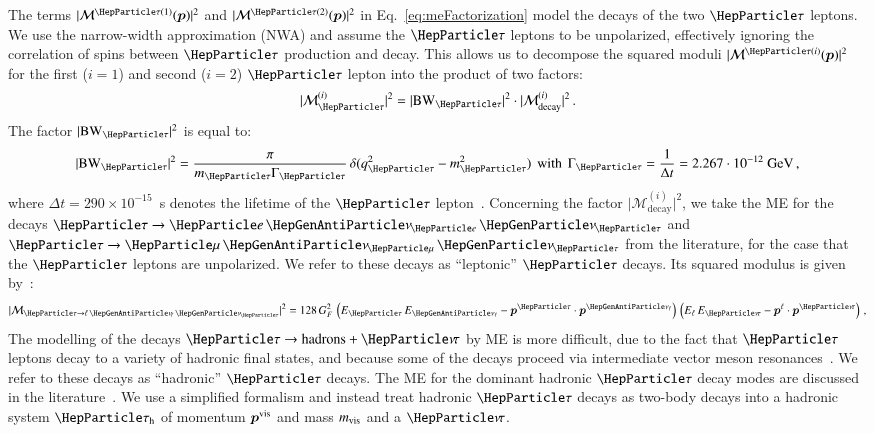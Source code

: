 The terms $\vert \mathcal{M}^{\Pgt(1)}(\bm{p}) \vert^{2}$ and $\vert
\mathcal{M}^{\Pgt(2)}(\bm{p}) \vert^{2}$ in Eq.~\ref{eq:meFactorization} model the decays of the two $\Pgt$ leptons.
We use the narrow-width approximation (NWA) and assume the $\Pgt$ leptons to be unpolarized,
effectively ignoring the correlation of spins between $\Pgt$ production and decay.
This allows us to decompose the squared moduli $\vert
\mathcal{M}^{\Pgt(i)}(\bm{p}) \vert^{2}$ for the first ($i=1$) and
second ($i=2$) $\Pgt$ lepton into the product of two factors:
\begin{equation}
\vert \mathcal{M}^{(i)}_{\Pgt} \vert^{2} = \vert \BW_{\Pgt} \vert^{2} \cdot \vert \mathcal{M}^{(i)}_{\textrm{decay}} \vert^{2} \, .
\end{equation}
The factor $\vert \BW_{\Pgt} \vert^{2}$ is equal to:
\begin{equation}
\vert \BW_{\Pgt} \vert^{2} = \frac{\pi}{m_{\Pgt}\Gamma_{\Pgt}} \,
\delta ( q_{\Pgt}^{2} - m_{\Pgt}^{2} ) \, \mbox{ with } \, 
\Gamma_{\Pgt} = \frac{1}{\Delta t} =
 2.267 \cdot 10^{-12}\textrm{~\GeV} \, ,
\end{equation}
where $\Delta t = 290 \times 10^{-15}$~s denotes the lifetime of the
$\Pgt$ lepton~\cite{PDG}.
Concerning the factor $\vert \mathcal{M}^{(i)}_{\textrm{decay}}
\vert^{2}$, we take the ME for the decays $\Pgt \to \enunu$ and $\Pgt
\to \mununu$ from the literature, for the case that the $\Pgt$ leptons
are unpolarized.
We refer to these decays as ``leptonic'' $\Pgt$ decays.
Its squared modulus is given by~\cite{Barger:1987nn}:
\begin{equation}
\vert\mathcal{M}_{\Pgt \to \ellnunu} \vert^{2} = 128 \, G^{2}_{F} \,
\left( E_{\Pgt} \, E_{\APnu_{\Plepton}} - \bm{p}^{\Pgt} \cdot
  \bm{p}^{\APnu_{\Plepton}} \right) \, \left( E_{\Plepton} \,
  E_{\Pnut} - \bm{p}^{\Plepton} \cdot \bm{p}^{\Pnut} \right) \, , 
\label{eq:leptonic_tau_decays_ME}
\end{equation}
The modelling of the decays $\Pgt \to \textrm{hadrons} + \Pnut$ 
by ME is more difficult, 
due to the fact that $\Pgt$ leptons decay to a variety of hadronic
final states, and because some of the decays proceed via intermediate vector
meson resonances~\cite{PDG}.
We refer to these decays as ``hadronic'' $\Pgt$ decays.
The ME for the dominant hadronic $\Pgt$ decay modes are discussed in the literature~\cite{Bullock:1992yt,Raychaudhuri:1995kv}.
We use a simplified formalism and instead treat hadronic $\Pgt$ decays as two-body decays into a hadronic system $\tauh$ of momentum $\bm{p}^{\textrm{vis}}$ and mass $m_{\textrm{vis}}$ and a $\Pnut$.

